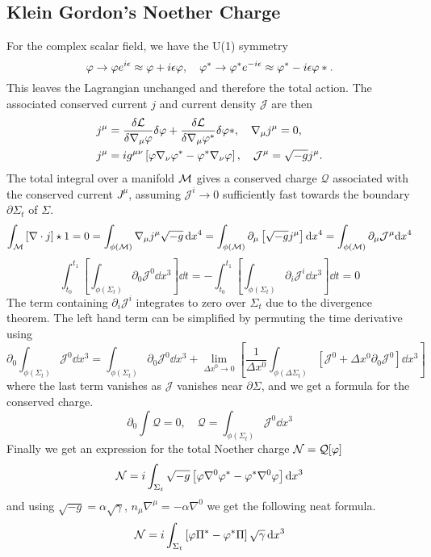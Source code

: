 \subsection{Klein Gordon's Noether Charge}
For the complex scalar field, we have the U(1) symmetry
\[\varphi \rightarrow \varphi e^{i\epsilon} \approx \varphi + i\epsilon \varphi , \quad\varphi^* \rightarrow \varphi^* e^{-i\epsilon}  \approx \varphi^* - i\epsilon \varphi*.\]
This leaves the Lagrangian unchanged and therefore the total action. The associated conserved current $j$ and current density $\mathcal{J}$ are then
\begin{align*} j^\mu &= \frac{\delta \mathcal{L}}{\delta \nabla_\mu\varphi}\delta \varphi + \frac{\delta \mathcal{L}}{\delta \nabla_\mu \varphi^*}\delta \varphi*, \quad \nabla_\mu j^\mu =0,\\
 j^\mu &=  ig^{\mu\nu}\left[\varphi\nabla_\nu\varphi^* - \varphi^*\nabla_\nu\varphi\right], \quad \mathcal{J}^\mu = \sqrt{-g}j^\mu.\end{align*}
The total integral over a manifold $\mathcal{M}$ gives a conserved charge $\mathcal{Q}$ associated with the conserved current $J^\mu$, assuming $\mathcal{J}^i\rightarrow0$ sufficiently fast towards the boundary $\partial \Sigma_t$ of $\Sigma$.
\[\int_{\mathcal{M}} \left[\nabla \cdot j\right] \star 1 = 0 = \int_{\phi(\mathcal{M})} \nabla_\mu j^\mu \sqrt{-g}\,\dd x^4 = \int_{\phi(\mathcal{M})} \partial_\mu \left[\sqrt{-g} j^{\mu} \right] \dd x^4= \int_{\phi(\mathcal{M})}\partial_\mu \mathcal{J}^\mu \dd x^4\]
\[ \int^{t_1}_{t_0}\left[\int_{\phi(\Sigma_t)} \partial_0 \mathcal{J}^0 \dd x^3 \right]\dd t = -\int^{t_1}_{t_0}\left[\int_{\phi(\Sigma_t)} \partial_i \mathcal{J}^i \dd x^3 \right]\dd t = 0\]
The term containing $\partial_i\mathcal{J}^i$ integrates to zero over $\Sigma_t$ due to the divergence theorem. The left hand term can be simplified by permuting the time derivative using
\[ \partial_0 \int_{\phi(\Sigma_t)}\mathcal{J}^0 \dd x^3 = \int_{\phi(\Sigma_t)}\partial_0 \mathcal{J}^0 \dd x^3 + \lim_{\Delta x^0\rightarrow0}\left[ \frac{1}{\Delta x^0}\int_{\phi(\Delta \Sigma_t)}\left[ \mathcal{J}^0 +\Delta x^0 \partial_0 \mathcal{J}^0\right] \dd x^3 \right]\]
where the last term vanishes as $\mathcal{J}$ vanishes near $\partial\Sigma$, and we get a formula for the conserved charge.
\[ \partial_0 \int \mathcal{Q}=0, \quad \mathcal{Q} = \int_{\phi(\Sigma_t)}\mathcal{J}^0 \dd x^3 \]
Finally we get an expression for the total Noether charge $\mathcal{N} = \mathcal{Q}[\varphi]$
\[\mathcal{N} =i \int_{\Sigma_t} \sqrt{-g}\left[ \varphi \nabla^0 \varphi^* - \varphi^*\nabla^0 \varphi\right] \dd x^3\]
and using $\sqrt{-g} = \alpha \sqrt{\gamma}$, $n_\mu \nabla^\mu = -\alpha \nabla^0$ we get the following neat formula.
\begin{equation} \mathcal{N} = i\int_{\Sigma_t}\left[ \varphi \Pi^*-\varphi^*\Pi\right] \sqrt{\gamma}\,\dd x^3\end{equation}

